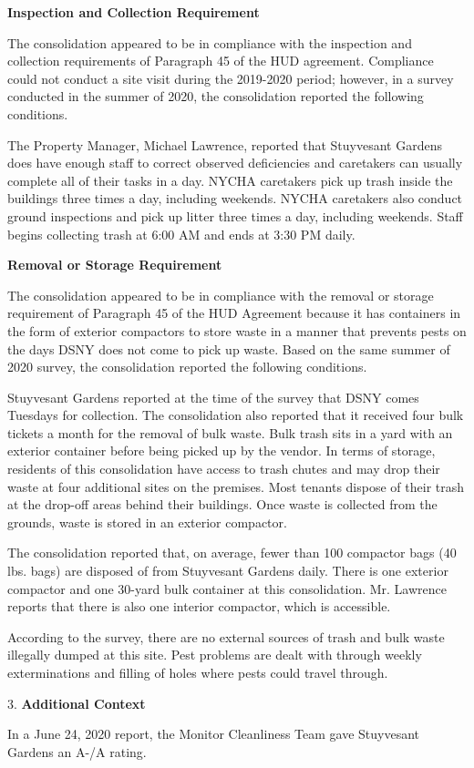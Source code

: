 
\textbf{Inspection and Collection Requirement}

The consolidation appeared to be in compliance with the inspection and collection requirements of Paragraph 45 of the HUD agreement. Compliance could not conduct a site visit during the 2019-2020 period; however, in a survey conducted in the summer of 2020, the consolidation reported the following conditions.

The Property Manager, Michael Lawrence, reported that Stuyvesant Gardens does have enough staff to correct observed deficiencies and caretakers can usually complete all of their tasks in a day. NYCHA caretakers pick up trash inside the buildings three times a day, including weekends. NYCHA caretakers also conduct ground inspections and pick up litter three times a day, including weekends. Staff begins collecting trash at 6:00 AM  and ends at 3:30 PM daily. 

\textbf{Removal or Storage Requirement}

The consolidation appeared to be in compliance with the  removal or storage requirement of Paragraph  45 of the HUD Agreement because it has containers in the form of exterior compactors to store waste in a manner that prevents pests on the days DSNY does not come to pick up waste. Based on the same summer of  2020 survey, the consolidation reported the following conditions.

Stuyvesant Gardens reported at the time of the survey that DSNY comes Tuesdays for collection. The consolidation also reported that it received four bulk tickets a month for the removal of bulk waste. Bulk trash sits in a yard with an exterior container before being picked up by the vendor. In terms of storage, residents of this consolidation have access to trash chutes and may drop their waste at four additional sites on the premises.  Most tenants dispose of their trash at the drop-off areas behind their buildings. Once waste is collected from the grounds, waste is stored in an exterior compactor.

The consolidation reported that, on average, fewer than 100 compactor bags (40 lbs. bags) are disposed of from Stuyvesant Gardens daily. There is one exterior compactor and one 30-yard bulk container at this consolidation. Mr. Lawrence reports that there is also one interior compactor, which is accessible.

According to the survey, there are no external sources of trash and bulk waste illegally dumped at this site. Pest problems are dealt with through weekly exterminations and filling of holes where pests could travel through.

3. \textbf{Additional Context} 

In a June 24, 2020 report, the Monitor Cleanliness Team gave Stuyvesant Gardens an A-/A rating. 